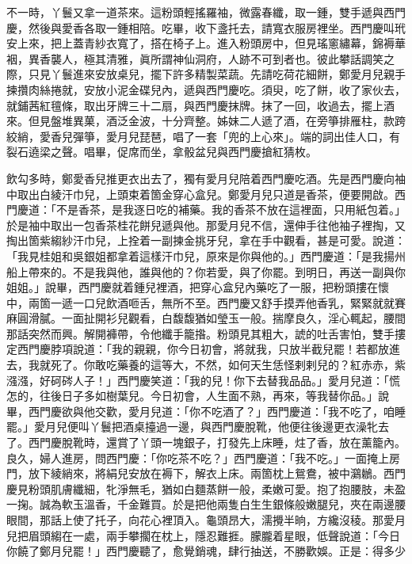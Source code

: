 不一時，丫鬟又拿一道茶來。這粉頭輕搖羅袖，微露春纖，取一鍾，雙手遞與西門慶，然後與愛香各取一鍾相陪。吃畢，收下盞托去，請寬衣服房裡坐。西門慶叫玳安上來，把上蓋青紗衣寬了，搭在椅子上。{}進入粉頭房中，但見瑤窻繡幕，錦褥華裀，異香襲人，極其清雅，眞所謂神仙洞府，人跡不可到者也。彼此攀話調笑之際，只見丫鬟進來安放桌兒，擺下許多精製菜蔬。先請吃荷花細餅，鄭愛月兒親手揀攢肉絲捲就，安放小泥金碟兒內，遞與西門慶吃。須臾，吃了餅，收了家伙去，就鋪茜紅氊條，取出牙牌三十二扇，與西門慶抹牌。抹了一回，收過去，擺上酒來。但見盤堆異菓，酒泛金波，十分齊整。姊妹二人遞了酒，在旁箏排雁柱，款跨絞綃，愛香兒彈箏，愛月兒琵琶，唱了一套「兜的上心來」。{}端的詞出佳人口，有裂石遶梁之聲。唱畢，促席而坐，拿骰盆兒與西門慶搶紅猜枚。

飲勾多時，鄭愛香兒推更衣出去了，獨有愛月兒陪着西門慶吃酒。先是西門慶向袖中取出白綾汗巾兒，上頭束着箇金穿心盒兒。鄭愛月兒只道是香茶，便要開啟。西門慶道：「不是香茶，是我逐日吃的補藥。{}我的香茶不放在這裡面，只用紙包着。」於是袖中取出一包香茶桂花餅兒遞與他。那愛月兒不信，還伸手往他袖子裡掏，又掏出箇紫縐紗汗巾兒，上拴着一副揀金挑牙兒，拿在手中觀看，甚是可愛。說道：「我見桂姐和吳銀姐都拿着這樣汗巾兒，原來是你與他的。」西門慶道：「是我揚州船上帶來的。不是我與他，誰與他的？你若愛，與了你罷。到明日，再送一副與你姐姐。」說畢，西門慶就着鍾兒裡酒，把穿心盒兒內藥吃了一服，把粉頭摟在懷中，兩箇一遞一口兒飲酒咂舌，無所不至。西門慶又舒手摸弄他香乳，緊緊就就賽麻圓滑膩。一面扯開衫兒觀看，白馥馥猶如瑩玉一般。揣摩良久，淫心輒起，腰間那話突然而興。解開褲帶，令他纖手籠揝。粉頭見其粗大，諕的吐舌害怕，雙手摟定西門慶脖項說道：「我的親親，你今日初會，將就我，只放半截兒罷！若都放進去，我就死了。你敢吃藥養的這等大，不然，如何天生恁怪剌剌兒的？紅赤赤，紫漒漒，好砢硶人子！」西門慶笑道：「我的兒！你下去替我品品。」愛月兒道：「慌怎的，往後日子多如樹葉兒。今日初會，人生面不熟，再來，等我替你品。」說畢，西門慶欲與他交歡，愛月兒道：「你不吃酒了？」西門慶道：「我不吃了，咱睡罷。」愛月兒便叫丫鬟把酒桌擡過一邊，與西門慶脫靴，他便往後邊更衣澡牝去了。西門慶脫靴時，還賞了丫頭一塊銀子，打發先上床睡，炷了香，放在薰籠內。良久，婦人進房，問西門慶：「你吃茶不吃？」西門慶道：「我不吃。」{}一面掩上房門，放下綾綃來，將絹兒安放在褥下，解衣上床。兩箇枕上鴛鴦，被中鸂鶒。西門慶見粉頭肌膚纖細，牝淨無毛，猶如白麵蒸餅一般，柔嫩可愛。抱了抱腰肢，未盈一掬。誠為軟玉溫香，千金難買。於是把他兩隻白生生銀條般嫩腿兒，夾在兩邊腰眼間，那話上使了托子，向花心裡頂入。龜頭昂大，濡攪半晌，方纔沒稜。那愛月兒把眉頭縐在一處，兩手攀擱在枕上，隱忍難捱。朦朧着星眼，低聲說道：「今日你饒了鄭月兒罷！」西門慶聽了，愈覺銷魂，肆行抽送，不勝歡娛。正是：得多少

